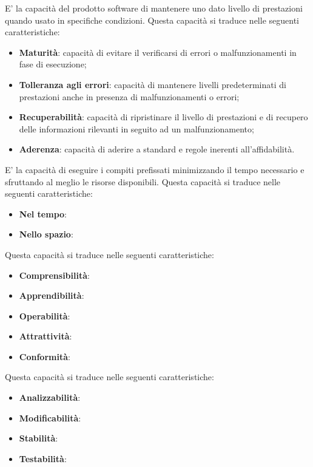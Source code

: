 	E' la capacità del prodotto software di mantenere uno dato livello di prestazioni quando usato in specifiche condizioni. Questa capacità si traduce nelle seguenti caratteristiche:
	\begin{itemize}
		\item{\textbf{Maturità}: capacità di evitare il verificarsi di errori o malfunzionamenti in fase di esecuzione;}
		\item{\textbf{Tolleranza agli errori}: capacità di mantenere livelli predeterminati di prestazioni anche in presenza di malfunzionamenti o errori;}
		\item{\textbf{Recuperabilità}: capacità di ripristinare il livello di prestazioni e di recupero delle informazioni rilevanti in seguito ad un malfunzionamento;}
		\item{\textbf{Aderenza}: capacità di aderire a standard e regole inerenti all'affidabilità.}
	\end{itemize}
	
	E' la capacità di eseguire i compiti prefissati minimizzando il tempo necessario e sfruttando al meglio le risorse disponibili. Questa capacità si traduce nelle seguenti caratteristiche:
	\begin{itemize}
		\item{\textbf{Nel tempo}:}
		\item{\textbf{Nello spazio}:}
	\end{itemize}
	
	Questa capacità si traduce nelle seguenti caratteristiche:
	\begin{itemize}
		\item{\textbf{Comprensibilità}:}
		\item{\textbf{Apprendibilità}:}
		\item{\textbf{Operabilità}:}
		\item{\textbf{Attrattività}:}
		\item{\textbf{Conformità}:}
	\end{itemize}

	Questa capacità si traduce nelle seguenti caratteristiche:
	\begin{itemize}
		\item{\textbf{Analizzabilità}:}
		\item{\textbf{Modificabilità}:}
		\item{\textbf{Stabilità}:}
		\item{\textbf{Testabilità}:}
	\end{itemize}


